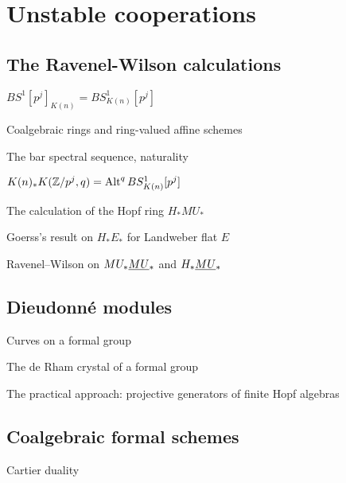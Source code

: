 
\chapter{Unstable cooperations}


\section{The Ravenel-Wilson calculations}

$BS^1[p^j]_{K(n)} = BS^1_{K(n)}[p^j]$

Coalgebraic rings and ring-valued affine schemes

The bar spectral sequence, naturality

$K(n)_* K(\mathbb Z/p^j, q) = \operatorname{Alt}^q BS^1_{K(n)}[p^j]$

The calculation of the Hopf ring $H_* MU_*$

Goerss's result on $H_* E_*$ for Landweber flat $E$

Ravenel--Wilson on $MU_* \smash{\underline{MU}}_{*}$ and $H_* \smash{\underline{MU}}_{*}$


\section{Dieudonn\'e modules}

Curves on a formal group

The de Rham crystal of a formal group

The practical approach: projective generators of finite Hopf algebras

\section{Coalgebraic formal schemes}

Cartier duality
